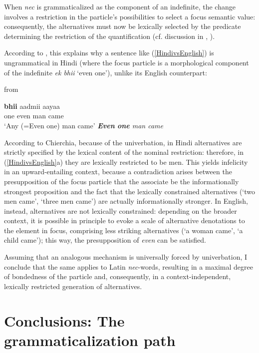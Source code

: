 \documentclass[output=paper]{langsci/langscibook}
\begin{document}
When {\emph{nec}} is grammaticalized as the component of an indefinite, the change involves a restriction in the particle's possibilities to select a focus semantic value: consequently, the alternatives must now be lexically selected by the predicate determining the restriction of the quantification (cf. discussion in \citealt[]{Lahiri98}, \citealt[]{Chierchia:2013}).

According to \citet[156--157]{Chierchia:2013}, this explains why a sentence like (\ref{HindivsEnglish}) is ungrammatical in Hindi (where the focus particle is a morphological component of the indefinite {\emph{ek bhii}} `even one'), unlike its English counterpart:

\begin{exe}
\ex \label{HindivsEnglish} from \citet[156--157]{Chierchia:2013}
\begin{xlist}
\ex {} {\textbf{bhii}} aadmii aayaa\\
          one even man came\\
\glt `Any (=Even one) man came'
\ex \itshape {\textbf{Even}} {\textbf{one}} man came
\end{xlist}
\end{exe}

\noindent According to Chierchia, because of the univerbation, in Hindi alternatives are strictly specified by the lexical content of the nominal restriction: therefore, in (\ref{HindivsEnglish}a) they are lexically restricted to be men. This yields infelicity in an upward-entailing context, because a contradiction arises between the presupposition of the focus particle that the associate be the informationally strongest proposition and the fact that the lexically constrained alternatives (`two men came', `three men came') are actually informationally stronger. In English, instead, alternatives are not lexically constrained: depending on the broader context, it is possible in principle to evoke a scale of alternative denotations to the element in focus, comprising less striking alternatives (`a woman came', `a child came'); this way, the presupposition of {\emph{even}} can be satisfied.

Assuming that an analogous mechanism is universally forced by univerbation, I conclude that the same applies to Latin {\emph{nec}}-words, resulting in a maximal degree of bondedness of the particle and, consequently, in a context-independent, lexically restricted generation of alternatives.

\section{Conclusions: The grammaticalization path} \label{sectionconclusions}
\end{document}
